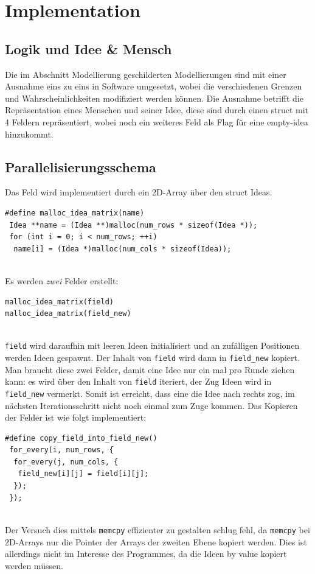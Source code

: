 \section{Implementation}
\subsection{Logik und Idee \& Mensch}
Die im Abschnitt Modellierung geschilderten Modellierungen sind mit einer Ausnahme eins zu eins in Software umgesetzt, wobei die verschiedenen Grenzen und Wahrscheinlichkeiten modifiziert werden können. Die Ausnahme betrifft die Repräsentation eines Menschen und seiner Idee, diese sind durch einen struct mit 4 Feldern repräsentiert, wobei noch ein weiteres Feld als Flag für eine empty-idea hinzukommt.

\subsection{Parallelisierungsschema}
Das Feld wird implementiert durch ein 2D-Array über den struct Ideas.

\begin{verbatim}
#define malloc_idea_matrix(name)
 Idea **name = (Idea **)malloc(num_rows * sizeof(Idea *));
 for (int i = 0; i < num_rows; ++i)
  name[i] = (Idea *)malloc(num_cols * sizeof(Idea));
\end{verbatim}
\quad \\
Es werden \textit{zwei} Felder erstellt:

\begin{verbatim}
malloc_idea_matrix(field)
malloc_idea_matrix(field_new)
\end{verbatim}
\quad \\
\texttt{field} wird daraufhin mit leeren Ideen initialisiert und an zufälligen Positionen werden Ideen gespawnt.
Der Inhalt von \texttt{field} wird dann in \texttt{field\_new} kopiert.
Man braucht diese zwei Felder, damit eine Idee nur ein mal pro Runde ziehen kann:
es wird über den Inhalt von \texttt{field} iteriert, der Zug Ideen wird in \texttt{field\_new} vermerkt.
Somit ist erreicht, dass eine die Idee nach rechts zog, im nächsten Iterationsschritt nicht noch einmal zum Zuge kommen.
Das Kopieren der Felder ist wie folgt implementiert:

\begin{verbatim}
#define copy_field_into_field_new()
 for_every(i, num_rows, {
  for_every(j, num_cols, {
   field_new[i][j] = field[i][j];
  });
 });
\end{verbatim}
\quad \\
Der Versuch dies mittels \texttt{memcpy} effizienter zu gestalten schlug fehl, da \texttt{memcpy} bei 2D-Arrays nur die Pointer der Arrays der zweiten Ebene kopiert werden.
Dies ist allerdings nicht im Interesse des Programmes, da die Ideen by value kopiert werden müssen. \\

